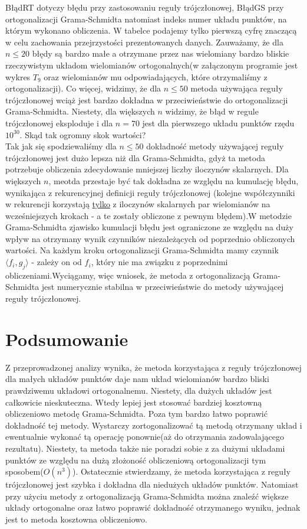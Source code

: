 \documentclass[12pt,wide]{mwart}
\begin{document}
BłądRT dotyczy błędu przy zastosowaniu reguły trójczłonowej, BłądGS przy ortogonalizacji Grama-Schmidta natomiast indeks numer układu punktów, na którym wykonano obliczenia. W tabelce podajemy tylko pierwszą cyfrę znaczącą w celu zachowania przejrzystości prezentowanych danych. Zauważamy, że dla $n\leq 20$ błędy są bardzo małe a otrzymane przez nas wielomiany bardzo bliskie rzeczywistym układom wielomianów ortogonalnych(w załączonym programie jest wykres $T_9$ oraz wielomianów mu odpowiadających, które otrzymaliśmy z ortogonalizacji). Co więcej, widzimy, że dla $n \leq 50$ metoda używająca reguły trójczłonowej wciąż jest bardzo dokładna w przeciwieństwie do ortogonalizacji Grama-Schmidta. Niestety, dla większych $n$ widzimy, że błąd w regule trójczłonowej eksploduje i dla $ n = 70$ jest dla pierwszego układu punktów rzędu $10^{30}$. Skąd tak ogromny skok wartości?\\

Tak jak się spodziewaliśmy dla $n \leq 50$ dokładność metody używającej reguły trójczłonowej jest dużo lepsza niż dla Grama-Schmidta, gdyż ta metoda potrzebuje obliczenia zdecydowanie mniejszej liczby iloczynów skalarnych. Dla większych $n$, meotda przestaje być tak dokładna ze względu na kumulację błędu, wynikająca z rekurencyjnej definicji reguły trójczłonowej (kolejne współczynniki w rekurencji korzystają \underline{tylko} z iloczynów skalarnych par wielomianów na wcześniejszych krokach - a te zostały obliczone z pewnym błędem).W metodzie Grama-Schmidta zjawisko kumulacji błędu jest ograniczone ze względu na duży wpływ na otrzymany wynik czynników niezależących od poprzednio obliczonych wartości.
Na każdym kroku ortogonalizacji Grama-Schmidta mamy czynnik $\langle f_i,g_j\rangle$ - zależy on od $f_i$, który nie ma związku z poprzednimi obliczeniami.Wyciągamy, więc wniosek, że metoda z ortogonalizacją Grama-Schmidta jest numerycznie stabilna w przeciwieństwie do metody używającej reguły trójczłonowej.
 
	
\section{Podsumowanie}

Z przeprowadzonej analizy wynika, że metoda korzystająca z reguły trójczłonowej dla małych układów punktów daje nam układ wielomianów bardzo bliski prawdziwemu układowi ortogonalnemu. Niestety, dla dużych układów jest całkowicie nieskuteczna. Wtedy lepiej jest stosować bardziej kosztowną obliczeniowo metodę Grama-Schmidta. Poza tym bardzo łatwo poprawić dokładność tej metody. Wystarczy zortogonalizować tą metodą otrzymany układ i ewentualnie wykonać tą operację ponownie(aż do otrzymania zadowalającego rezultatu). Niestety, ta metoda także nie poradzi sobie z za dużymi układami punktów ze względu na dużą złożoność obliczeniową ortogonalizacji tym sposobem($O(n^3)$). Ostatecznie stwierdzamy, że metoda korzystająca z reguły trójczłonowej jest szybka i dokładna dla niedużych układów punktów. Natomiast przy użyciu metody z ortogonalizacją Grama-Schmidta można znaleźć większe układy ortogonalne oraz łatwo poprawić dokładność otrzymanego wyniku, jednak jest to metoda kosztowna obliczeniowo. 
\end{document}
